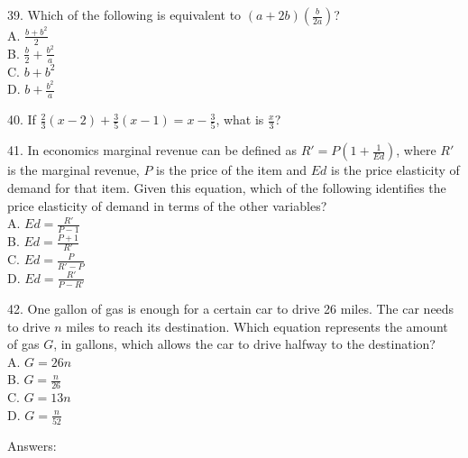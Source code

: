 \documentclass[../satmath.tex]{subfiles}
\begin{document}
39. Which of the following is equivalent to $(a+2b)\left(\frac{b}{2a}\right)$?\\
A. $\frac{b+b^2}{2}$\\
B. $\frac{b}{2}+\frac{b^2}{a}$\\
C. $b+b^2$\\
D. $b+\frac{b^2}{a}$
\medbreak

40. If $\frac{2}{3}(x-2)+\frac{3}{5}(x-1)=x-\frac{3}{5}$, what is $\frac{x}{3}$?
\medbreak

41. In economics marginal revenue can be defined as $R'=P\left(1+\frac{1}{Ed}\right)$, where $R'$ is the marginal revenue, $P$ is the price 
of the item and $Ed$ is the price elasticity of demand for that item. Given this equation, which of the following identifies the price elasticity 
of demand in terms of the other variables?\\
A. $Ed=\frac{R'}{P-1}$\\
B. $Ed=\frac{P+1}{R'}$\\
C. $Ed=\frac{P}{R'-P}$\\
D. $Ed=\frac{R'}{P-R'}$
\medbreak

42. One gallon of gas is enough for a certain car to drive 26 miles. The car needs to drive $n$ miles to reach its destination. Which equation
represents the amount of gas $G$, in gallons, which allows the car to drive halfway to the destination?\\
A. $G=26n$\\
B. $G=\frac{n}{26}$\\
C. $G=13n$\\
D. $G=\frac{n}{52}$
\medbreak

Answers:
\end{document}
